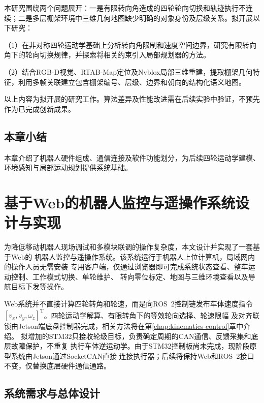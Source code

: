 \documentclass[UTF8,12pt,a4paper,openany]{ctexbook}
\begin{document}
本研究围绕两个问题展开：一是有限转向角造成的四轮轮向切换和轨迹执行不连续；二是多层棚架环境中三维几何地图缺少明确的对象身份及层级关系。拟开展以下研究：

（1）在非对称四轮运动学基础上分析转向角限制和速度空间边界，研究有限转向角下的轮向切换规律，并探索将相关约束引入局部规划器的方法。

（2）结合RGB-D视觉、RTAB-Map定位及Nvblox局部三维重建，提取棚架几何特征，利用多帧关联建立包含棚架编号、层级、边界和朝向的结构化语义地图。

以上内容为拟开展的研究工作。算法差异及性能改进需在后续实验中验证，不预先作为已完成创新成果。

\section{本章小结}

本章介绍了机器人硬件组成、通信连接及软件功能划分，为后续四轮运动学建模、环境感知与局部运动规划提供系统基础。


\chapter{基于Web的机器人监控与遥操作系统设计与实现}
\label{chap:web-control}

为降低移动机器人现场调试和多模块联调的操作复杂度，本文设计并实现了一套基于Web的
机器人监控与遥操作系统。该系统运行于机器人上位计算机，局域网内的操作人员无需安装
专用客户端，仅通过浏览器即可完成系统状态查看、整车运动控制、工作模式切换、单轮维护、
转向零位标定、地图与三维环境查看以及导航目标下发等操作。

Web系统并不直接计算四轮转角和轮速，而是向ROS~2控制链发布车体速度指令
$[v_x,v_y,\omega_z]^{\mathrm T}$。四轮运动学解算、有限转角下的等效轮向选择、轮速限幅
及对齐联锁由Jetson端底盘控制器完成，相关方法将在第\ref{chap:kinematics-control}章中介绍。
拟增加的STM32只接收轮级目标，负责确定周期的CAN通信、反馈采集和底层故障保护，不重复
执行车体逆运动学。由于STM32控制板尚未完成，现阶段原型系统由Jetson通过SocketCAN直接
连接执行器；后续将保持Web和ROS~2接口不变，仅替换底层硬件通信通路。

\section{系统需求与总体设计}
\end{document}
